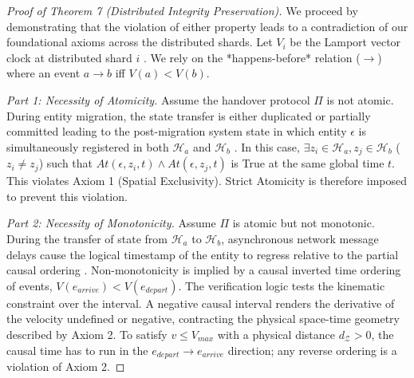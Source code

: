 \documentclass[conference]{IEEEtran}
\newcommand{\Z}{\mathcal{Z}} %
\begin{document}
\begin{proof}[Proof of Theorem 7 (Distributed Integrity Preservation)]
We proceed by demonstrating that the violation of either property leads to a contradiction of our foundational axioms across the distributed shards. Let $V_i$ be the Lamport vector clock at distributed shard $i$ \cite{b8}. We rely on the *happens-before* relation ($\to$) where an event $a \to b$ iff $V(a) < V(b)$.

\textit{Part 1: Necessity of Atomicity.} 
Assume the handover protocol $\Pi$ is not atomic. During entity migration, the state transfer is either duplicated or partially committed leading to the post-migration system state in which entity $\epsilon$ is simultaneously registered in both $\mathcal{H}_a$ and $\mathcal{H}_b$ \cite{b24}. In this case, $\exists z_i \in \mathcal{H}_a, z_j \in \mathcal{H}_b$ ($z_i \neq z_j$) such that $At(\epsilon, z_i, t) \land At(\epsilon, z_j, t)$ is True at the same global time $t$. This violates Axiom 1 (Spatial Exclusivity). Strict Atomicity is therefore imposed to prevent this violation.

\textit{Part 2: Necessity of Monotonicity.}
Assume $\Pi$ is atomic but not monotonic. During the transfer of state from $\mathcal{H}_a$ to $\mathcal{H}_b$, asynchronous network message delays cause the logical timestamp of the entity to regress relative to the partial causal ordering \cite{b25}. Non-monotonicity is implied by a causal inverted time ordering of events, $V(e_{arrive}) < V(e_{depart})$. The verification logic tests the kinematic constraint over the interval. A negative causal interval renders the derivative of the velocity undefined or negative, contracting the physical space-time geometry described by Axiom 2. To satisfy $v \le V_{max}$ with a physical distance $d_\Z > 0$, the causal time has to run in the $e_{depart} \to e_{arrive}$ direction; any reverse ordering is a violation of Axiom 2.
\end{proof}
\end{document}
